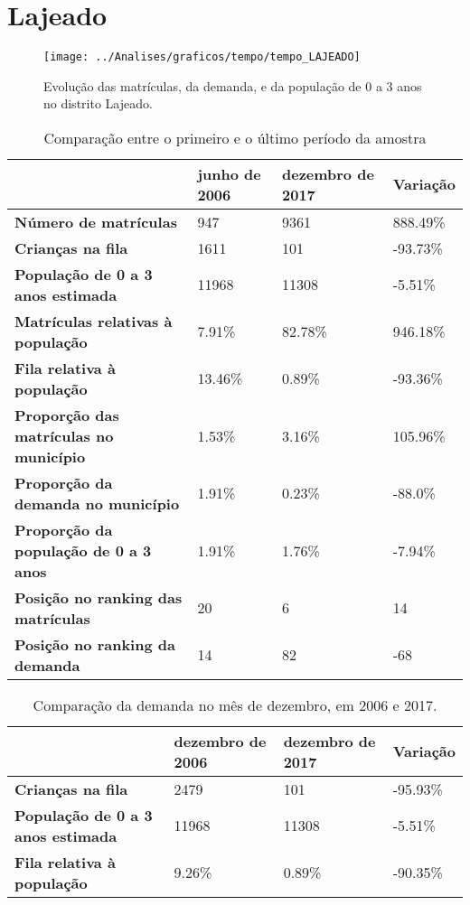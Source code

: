 \section{Lajeado}
\begin{figure}[H]
\centering
\texttt{[image: ../Analises/graficos/tempo/tempo\_LAJEADO]}
\caption{Evolução das matrículas, da demanda, e da população de 0 a 3 anos no distrito Lajeado.}
\end{figure}
\begin{table}[H]
\begin{tabular}{|l|l|l|l|}
\hline
\textbf{}                                      & \textbf{junho de 2006}       & \textbf{dezembro de 2017}    & \textbf{Variação} \\ \hline
\textbf{Número de matrículas}                  & 947 & 9361 & 888.49\% \\ \hline
\textbf{Crianças na fila}                      & 1611 & 101 & -93.73\% \\ \hline
\textbf{População de 0 a 3 anos estimada}      & 11968 & 11308 & -5.51\% \\ \hline
\textbf{Matrículas relativas à população}      & 7.91\% & 82.78\% & 946.18\% \\ \hline
\textbf{Fila relativa à população}             & 13.46\% & 0.89\% & -93.36\% \\ \hline
\textbf{Proporção das matrículas no município} & 1.53\% & 3.16\% & 105.96\% \\ \hline
\textbf{Proporção da demanda no município}     & 1.91\% & 0.23\% & -88.0\% \\ \hline
\textbf{Proporção da população de 0 a 3 anos}  & 1.91\% & 1.76\% & -7.94\% \\ \hline
\textbf{Posição no ranking das matrículas}     & 20 & 6 & 14 \\ \hline
\textbf{Posição no ranking da demanda}         & 14 & 82 & -68 \\ \hline
\end{tabular}
\caption{Comparação entre o primeiro e o último período da amostra}
\end{table}
\begin{table}[H]
\begin{tabular}{|l|l|l|l|}
\hline
\textbf{}                                 & \textbf{dezembro de 2006} & \textbf{dezembro de 2017} & \textbf{Variação} \\ \hline
\textbf{Crianças na fila}                      & 2479 & 101 & -95.93\% \\ \hline
\textbf{População de 0 a 3 anos estimada}      & 11968 & 11308 & -5.51\% \\ \hline
\textbf{Fila relativa à população}             & 9.26\% & 0.89\% & -90.35\% \\ \hline
\end{tabular}
\caption{Comparação da demanda no mês de dezembro, em 2006 e 2017.}
\end{table}
